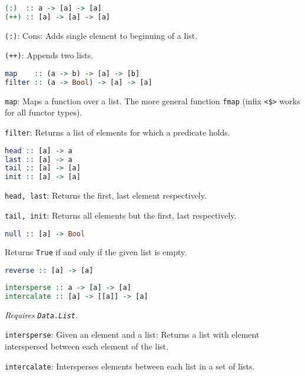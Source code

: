 \documentclass[twocolumn,english]{article}
\begin{document}
\begin{lstlisting}[language=Haskell,frame=single]
(:)  :: a -> [a] -> [a]
(++) :: [a] -> [a] -> [a]
\end{lstlisting}


\texttt{(:)}: Cons: Adds single element to beginning of a list.

\texttt{(++)}: Appends two lists.

\begin{lstlisting}[language=Haskell,frame=single]
map    :: (a -> b) -> [a] -> [b]
filter :: (a -> Bool) -> [a] -> [a]
\end{lstlisting}


\texttt{map}: Maps a function over a list. The more general function
\texttt{fmap} (infix \texttt{<\$>} works for all functor types).

\texttt{filter}: Returns a list of elements for which a predicate
holds.

\begin{lstlisting}[language=Haskell,frame=single]
head :: [a] -> a
last :: [a] -> a
tail :: [a] -> [a]
init :: [a] -> [a]
\end{lstlisting}

\texttt{head, last}: Returns the first, last element respectively.

\texttt{tail, init}: Returns all elements but the first, last respectively.

\begin{lstlisting}[language=Haskell,frame=single]
null :: [a] -> Bool
\end{lstlisting}


Returns \texttt{True} if and only if the given list is empty.

\begin{lstlisting}[language=Haskell,frame=single]
reverse :: [a] -> [a]
\end{lstlisting}


\begin{lstlisting}[language=Haskell,frame=single]
intersperse :: a -> [a] -> [a]
intercalate :: [a] -> [[a]] -> [a]
\end{lstlisting}


\emph{Requires }\texttt{\emph{Data.List}}\emph{.}

\texttt{intersperse}: Given an element and a list: Returns a list
with element interspersed between each element of the list.

\texttt{intercalate}: Intersperses elements between each list in a
set of lists.
\end{document}
